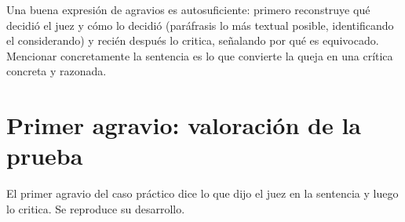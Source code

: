 \documentclass[12pt,oneside]{book}
\begin{document}
\begin{important}
Una buena expresión de agravios es autosuficiente: primero reconstruye qué decidió el juez y cómo lo decidió (paráfrasis lo más textual posible, identificando el considerando) y recién después lo critica, señalando por qué es equivocado. Mencionar concretamente la sentencia es lo que convierte la queja en una crítica concreta y razonada.
\end{important}

\section{Primer agravio: valoración de la prueba}

El primer agravio del caso práctico dice lo que dijo el juez en la sentencia y luego lo critica. Se reproduce su desarrollo.
\end{document}
